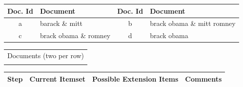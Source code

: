 \documentclass[letterpaper,12pt,titlepage,oneside,final]{book}
\begin{document}
\begin{landscape}

\begin{table}
\centering
\begin{tabular}{|c|p{5cm}||c|p{5cm}|} \hline
Doc. Id & Document & Doc. Id & Document\\\hline
a& barack \& mitt & b & brack obama \& mitt romney  \\\hline
c& brack obama \& romney & d & brack obama  \\\hline
\end{tabular}
\begin{tabular}{c}
Documents (two per row)\\\\
\end{tabular}
\begin{tabular}{|c|p{6.5cm}|p{6cm}|p{7cm}|} %
\hline
Step&Current Itemset&Possible Extension Items&Comments\\ \hline


\end{tabular}
\end{table}
\end{landscape}
\end{document}
